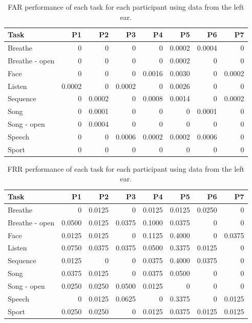 \documentclass{sigchi}
\begin{document}
\begin{table}
\begin{center}
\begin{tabular*}{\textwidth}{@{\extracolsep{\fill}}lrrrrrrr}
\textbf{Task} & P1 & P2 & P3 & P4 & P5 & P6 & P7\\ \hline
Breathe & 0 & 0 & 0 & 0 & 0.0002 & 0.0004 & 0\\
Breathe - open & 0 & 0 & 0 & 0 & 0.0002 & 0 & 0\\
Face & 0 & 0 & 0 & 0.0016 & 0.0030 & 0 & 0.0002\\
Listen & 0.0002 & 0 & 0.0002 & 0 & 0.0026 & 0 & 0\\
Sequence & 0 & 0.0002 & 0 & 0.0008 & 0.0014 & 0 & 0.0002\\
Song & 0 & 0.0001 & 0 & 0 & 0 & 0.0001 & 0\\
Song - open & 0 & 0.0004 & 0 & 0 & 0 & 0 & 0\\
Speech & 0 & 0 & 0.0006 & 0.0002 & 0.0002 & 0.0006 & 0\\
Sport & 0 & 0 & 0 & 0 & 0 & 0 & 0\\ \hline
\end{tabular*}
\end{center}
\caption{FAR performance of each task for each participant using data from the left ear.}
\label{tab:farall}
\end{table}

\begin{table}
\begin{center}
\begin{tabular*}{\textwidth}{@{\extracolsep{\fill}}lrrrrrrr}
\textbf{Task} & P1 & P2 & P3 & P4 & P5 & P6 & P7\\ \hline
Breathe & 0 & 0.0125 & 0 & 0.0125 & 0.0125 & 0.0250 & 0\\
Breathe - open & 0.0500 & 0.0125 & 0.0375 & 0.1000 & 0.0375 & 0 & 0\\
Face & 0.0125 & 0.0125 & 0 & 0.1125 & 0.4000 & 0 & 0.0375\\
Listen & 0.0750 & 0.0375 & 0.0375 & 0.0500 & 0.3375 & 0.0125 & 0\\
Sequence & 0.0125 & 0 & 0 & 0.0375 & 0.4000 & 0.0375 & 0\\
Song & 0.0375 & 0.0125 & 0 & 0.0375 & 0.0500 & 0 & 0\\
Song - open & 0.0250 & 0.0250 & 0.0500 & 0.0125 & 0 & 0 & 0\\
Speech & 0 & 0.0125 & 0.0625 & 0 & 0.3375 & 0 & 0.0125\\
Sport & 0.0250 & 0.0250 & 0 & 0.0125 & 0.0375 & 0.0125 & 0.0125\\ \hline
\end{tabular*}
\end{center}
\caption{FRR performance of each task for each participant using data from the left ear.}
\label{tab:frrall}
\end{table}
\end{document}
